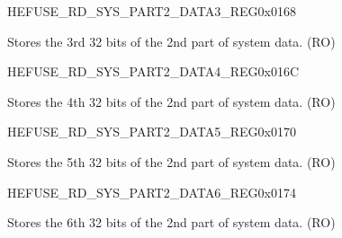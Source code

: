\begin{register}{H}{EFUSE\_RD\_SYS\_PART2\_DATA3\_REG}{0x0168}\label{regdesc:EFUSERDSYSPART2DATA3REG}
%
\regnewline%
\begin{regdesc}\begin{reglist}
\label{fielddesc:EFUSESYSDATAPART23}\item [EFUSE\_SYS\_DATA\_PART2\_3] Stores the 3rd 32 bits of the 2nd part of system data. (RO)
\end{reglist}\end{regdesc}
\end{register}


\begin{register}{H}{EFUSE\_RD\_SYS\_PART2\_DATA4\_REG}{0x016C}\label{regdesc:EFUSERDSYSPART2DATA4REG}
%
\regnewline%
\begin{regdesc}\begin{reglist}
\label{fielddesc:EFUSESYSDATAPART24}\item [EFUSE\_SYS\_DATA\_PART2\_4] Stores the 4th 32 bits of the 2nd part of system data. (RO)
\end{reglist}\end{regdesc}
\end{register}


\begin{register}{H}{EFUSE\_RD\_SYS\_PART2\_DATA5\_REG}{0x0170}\label{regdesc:EFUSERDSYSPART2DATA5REG}
%
\regnewline%
\begin{regdesc}\begin{reglist}
\label{fielddesc:EFUSESYSDATAPART25}\item [EFUSE\_SYS\_DATA\_PART2\_5] Stores the 5th 32 bits of the 2nd part of system data. (RO)
\end{reglist}\end{regdesc}
\end{register}


\begin{register}{H}{EFUSE\_RD\_SYS\_PART2\_DATA6\_REG}{0x0174}\label{regdesc:EFUSERDSYSPART2DATA6REG}
%
\regnewline%
\begin{regdesc}\begin{reglist}
\label{fielddesc:EFUSESYSDATAPART26}\item [EFUSE\_SYS\_DATA\_PART2\_6] Stores the 6th 32 bits of the 2nd part of system data. (RO)
\end{reglist}\end{regdesc}
\end{register}


